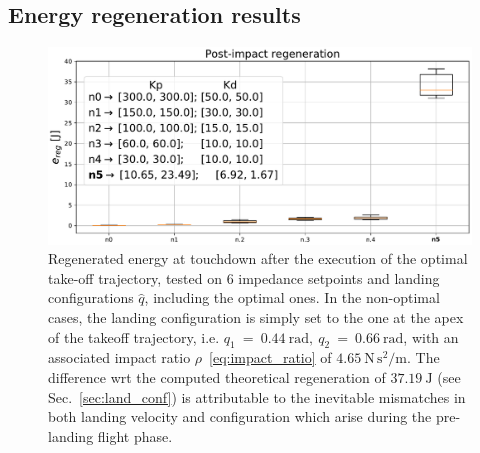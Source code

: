 \subsection{Energy regeneration results}
\begin{figure}[t]
    \centering
    \includegraphics[width=1\columnwidth]{images/opt_vs_non_opt_conf.pdf}
    \caption{Regenerated energy at touchdown after the execution of the optimal take-off trajectory, tested on 6 impedance setpoints and landing configurations $\hat{q}$, including the optimal ones. In the non-optimal cases, the landing configuration is simply set to the one at the apex of the takeoff trajectory, i.e. $q_1~=~0.44~\mathrm{rad},~q_2~=~0.66~\mathrm{rad}$, with an associated impact ratio $\rho$~\eqref{eq:impact_ratio} of $4.65~\mathrm{N\,s^2/m}$. 
   	The difference wrt the computed theoretical regeneration of $37.19~\mathrm{J}$ (see Sec.~\ref{sec:land_conf}) is attributable to the inevitable mismatches in both landing velocity and configuration which arise during the pre-landing flight phase.\vspace{-0.3cm}}
    \label{fig:energy_rec_comp}
\end{figure}
